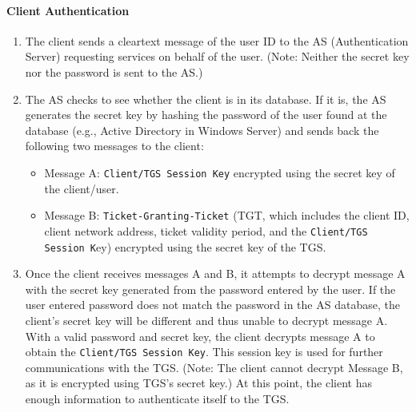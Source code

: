 \paragraph{Client Authentication}

\begin{enumerate}
  \item The client sends a cleartext message of the user ID to the AS (Authentication Server) requesting services on behalf of the user. (Note: Neither the secret key nor the password is sent to the AS.)
  \item The AS checks to see whether the client is in its database. If it is, the AS generates the secret key by hashing the password of the user found at the database (e.g., Active Directory in Windows Server) and sends back the following two messages to the client:
        \begin{itemize}
          \item Message A: \texttt{Client/TGS Session Key} encrypted using the secret key of the client/user.
          \item Message B: \texttt{Ticket-Granting-Ticket} (TGT, which includes the client ID, client network address, ticket validity period, and the \texttt{Client/TGS Session K}ey) encrypted using the secret key of the TGS.
        \end{itemize}
  \item Once the client receives messages A and B, it attempts to decrypt message A with the secret key generated from the password entered by the user. If the user entered password does not match the password in the AS database, the client's secret key will be different and thus unable to decrypt message A. With a valid password and secret key, the client decrypts message A to obtain the \texttt{Client/TGS Session Key}. This session key is used for further communications with the TGS. (Note: The client cannot decrypt Message B, as it is encrypted using TGS's secret key.) At this point, the client has enough information to authenticate itself to the TGS.
\end{enumerate}



